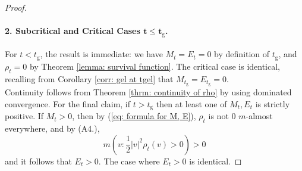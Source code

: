 \begin{proof}
\paragraph{2. Subcritical and Critical Cases $\mathbf{t\le t_\mathrm{g}}$.} For $t<t_\mathrm{g}$, the result is immediate: we have $M_t=E_t=0$ by definition of $t_\mathrm{g}$, and $\rho_t=0$ by Theorem \ref{lemma: survival function}. The critical case is identical, recalling from Corollary \ref{corr: gel at tgel} that $M_{t_\mathrm{g}}=E_{t_\mathrm{g}}=0.$ \medskip \\ Continuity follows from Theorem \ref{thrm: continuity of rho} by using dominated convergence. For the final claim, if $t>t_\mathrm{g}$ then at least one of $M_t, E_t$ is strictly positive. If $M_t>0$, then by (\ref{eq: formula for M, E}), $\rho_t$ is not $0$ $m$-almost everywhere, and by (A4.), \begin{equation} m\left(v: \frac{1}{2}|v|^2\rho_t(v)>0\right)>0 \end{equation} and it follows that $E_t>0$. The case where $E_t>0$ is identical.   \end{proof}


